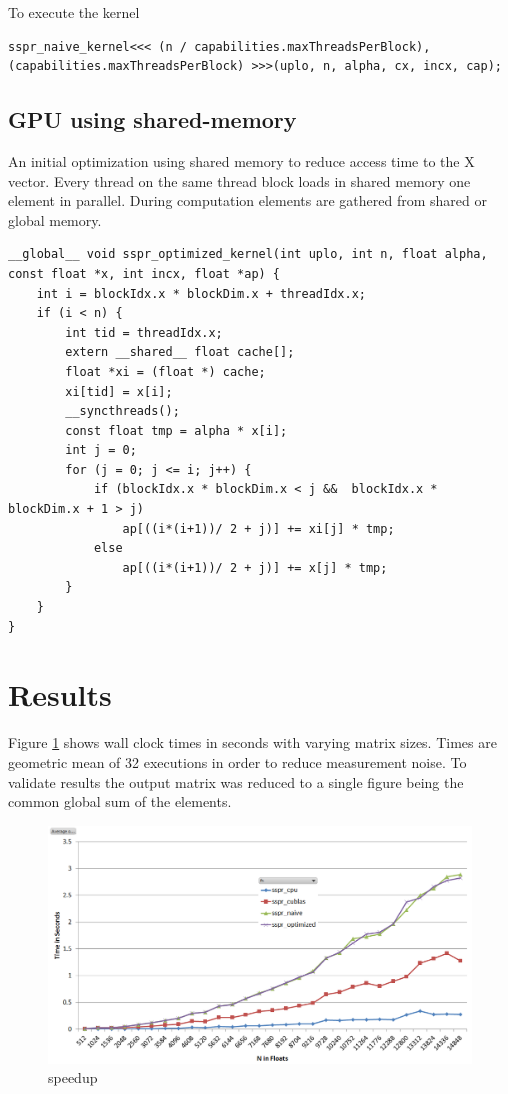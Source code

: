 \documentclass{llncs}
\begin{document}
To execute the kernel

\begin{lstlisting}
sspr_naive_kernel<<< (n / capabilities.maxThreadsPerBlock), (capabilities.maxThreadsPerBlock) >>>(uplo, n, alpha, cx, incx, cap);
\end{lstlisting}

\subsection{GPU using shared-memory}

An initial optimization using shared memory to reduce access time to the X vector.
Every thread on the same thread block loads in shared memory one element in parallel.
During computation elements are gathered from shared or global memory.

\begin{lstlisting}[caption={Optimized SSPR GPU Implementation},label={lst:gpuoptimized}]
__global__ void sspr_optimized_kernel(int uplo, int n, float alpha, const float *x, int incx, float *ap) {
	int i = blockIdx.x * blockDim.x + threadIdx.x;
	if (i < n) {
		int tid = threadIdx.x;
		extern __shared__ float cache[];
		float *xi = (float *) cache;
		xi[tid] = x[i];
		__syncthreads();
		const float tmp = alpha * x[i];
		int j = 0;
		for (j = 0; j <= i; j++) {
			if (blockIdx.x * blockDim.x < j &&	blockIdx.x * blockDim.x + 1 > j)
				ap[((i*(i+1))/ 2 + j)] += xi[j] * tmp;
			else
				ap[((i*(i+1))/ 2 + j)] += x[j] * tmp;
		}
	}
}
\end{lstlisting}

\section{Results}

Figure \ref{fig:speedup} shows wall clock times in seconds with varying matrix sizes.
Times are geometric mean of 32 executions in order to reduce measurement noise.
To validate results the output matrix was reduced to a single figure being the common global sum of the elements.

\begin{figure}
\begin{center}
\includegraphics[scale=0.7]{speedup.png}
\caption{speedup}
\label{fig:speedup}
\end{center}
\end{figure}
\end{document}
